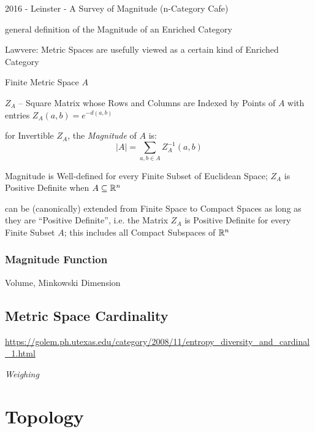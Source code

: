 2016 - Leinster - A Survey of Magnitude (n-Category Cafe) %

general definition of the Magnitude of an Enriched Category %

Lawvere: Metric Spaces are usefully viewed as a certain kind of
Enriched Category

Finite Metric Space $A$

$Z_A$ -- Square Matrix whose Rows and Columns are Indexed by Points of
$A$ with entries $Z_A(a,b) = e^{-d(a,b)}$

for Invertible $Z_A$, the \emph{Magnitude} of $A$ is:
\[
  |A| = \sum_{a,b \in A} Z^{-1}_A (a,b)
\]

Magnitude is Well-defined for every Finite Subset of Euclidean Space;
$Z_A$ is Positive Definite when $A \subseteq \mathbb{R}^n$

can be (canonically) extended from Finite Space to Compact Spaces as
long as they are ``Positive Definite'', i.e. the Matrix $Z_A$ is
Positive Definite for every Finite Subset $A$; this includes all
Compact Subspaces of $\mathbb{R}^n$



\subsubsection{Magnitude Function}\label{sec:magnitude_function}

Volume, Minkowski Dimension



\subsection{Metric Space Cardinality}\label{sec:metric_cardinality}

\url{https://golem.ph.utexas.edu/category/2008/11/entropy_diversity_and_cardinal_1.html}

\emph{Weighing}



\section{Topology}\label{sec:topology}

